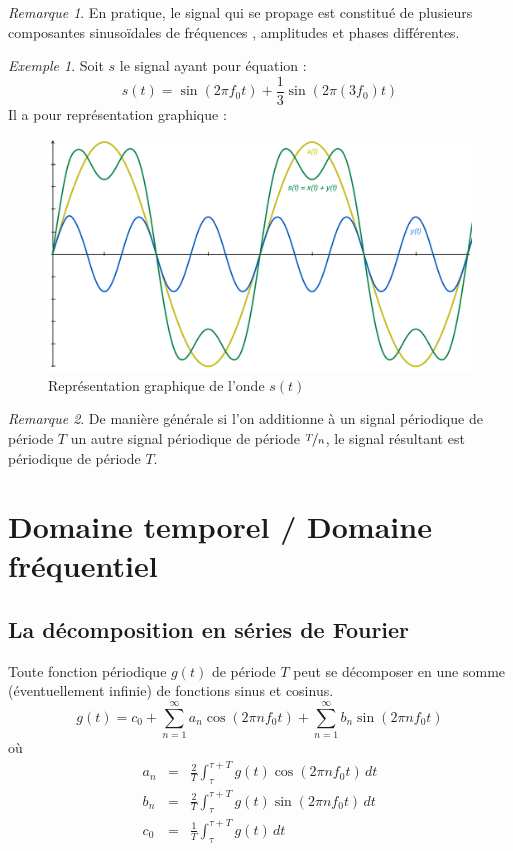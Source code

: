 \documentclass[11pt,english,french]{scrreprt}
\theoremstyle{remark}
\newtheorem*{rem*}{Remarque}
\newtheorem*{ex*}{Exemple}
\theoremstyle{definition}
\begin{document}
\begin{rem*}
	En pratique, le signal qui se propage est constitué de plusieurs composantes sinusoïdales de fréquences , amplitudes et phases différentes.
\end{rem*}

\begin{ex*}
	Soit $s$ le signal ayant pour équation :\[
	s(t)=\sin(2\pi f_0 t)+\frac{1}{3}\sin(2\pi(3f_0)t)
	\]Il a pour représentation graphique :
	\begin{figure}[h!]
		\center
		\includegraphics[scale=.5]{graphes/onde}
		\caption{Représentation graphique de l'onde $s(t)$}
	\end{figure}
\end{ex*}

\begin{rem*}
	De manière générale si l'on additionne à un signal périodique de période $T$ un autre signal périodique de période $\nicefrac{T}{n}$, le signal résultant est périodique de période $T$.
\end{rem*}

\section{Domaine temporel / Domaine fréquentiel} %

\subsection{La décomposition en séries de Fourier} %
Toute fonction périodique $g(t)$ de période $T$ peut se décomposer en une somme (éventuellement infinie) de fonctions sinus et cosinus.
\[
	g\left(t\right)=c_{0}+\sum_{n=1}^{\infty}a_{n}\cos\left(2\pi nf_{0}t\right)+\sum_{n=1}^{\infty}b_{n}\sin\left(2\pi nf_{0}t\right)
\]où
\begin{eqnarray*}
a_{n} & = & \frac{2}{T}\int_{\tau}^{\tau+T}g\left(t\right)\cos\left(2\pi nf_{0}t\right)\, dt\\
b_{n} & = & \frac{2}{T}\int_{\tau}^{\tau+T}g\left(t\right)\sin\left(2\pi nf_{0}t\right)\, dt\\
c_{0} & = & \frac{1}{T}\int_{\tau}^{\tau+T}g\left(t\right)\, dt\end{eqnarray*}
\end{document}
